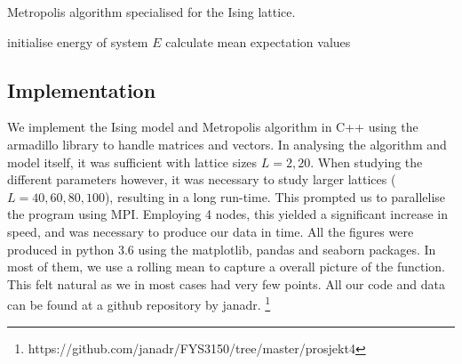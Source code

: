 	\begin{algorithm}[htbp]
	\label{algo:metro}
	\caption{Metropolis algorithm specialised for the Ising lattice.}
		\SetAlgoLined
		\BlankLine
		\BlankLine
		initialise energy of system $E$\;
		calculate mean expectation values\;	
		\BlankLine
		\BlankLine
	\end{algorithm}

\subsection{Implementation}
\label{sec:implementation}

We implement the Ising model and Metropolis algorithm in C++ using the armadillo library to handle matrices and vectors. In analysing the algorithm and model itself, it was sufficient with lattice sizes $L=2, 20$. When studying the different parameters however, it was necessary to study larger lattices ($L = 40, 60, 80, 100$), resulting in a long run-time. This prompted us to parallelise the program using MPI. Employing 4 nodes, this yielded a significant increase in speed, and was necessary to produce our data in time.
All the figures were produced in python 3.6 using the matplotlib, pandas and seaborn packages. In most of them, we use a rolling mean to capture a overall picture of the function. This felt natural as we in most cases had very few points. All our code and data can be found at a github repository by janadr. \footnote{https://github.com/janadr/FYS3150/tree/master/prosjekt4}
